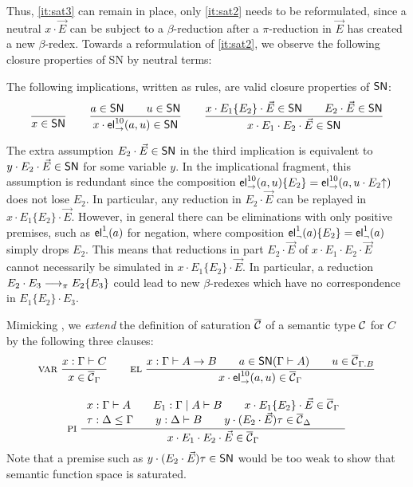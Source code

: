 Thus, \ref{it:sat3} can remain in place, only \ref{it:sat2} needs to
be reformulated, since a neutral $x \cdot \vec E$ can be subject to a
$\beta$-reduction after a $\pi$-reduction in $\vec E$ has created a
new $\beta$-redex.  Towards a reformulation of \ref{it:sat2}, we
observe the following closure properties of SN by neutral terms:
\begin{lemma}
  \label{lem:clos-ne}
  The following implications, written as rules, are valid closure
  properties of $\SN$:
\begin{gather*}
  \ru{}{x \in \SN}
\qquad
  \ru{a \in \SN \qquad u \in \SN
    }{x \cdot \el\to{10}(a,u) \in \SN}
\qquad
  \ru{x \cdot E_1\{E_2\} \cdot \vec E \in \SN \qquad
      E_2 \cdot \vec E \in \SN
    }{x \cdot E_1 \cdot E_2 \cdot \vec E \in \SN}
\end{gather*}
\end{lemma}
The extra assumption $E_2 \cdot \vec E \in \SN$ in the third
implication is equivalent to $y \cdot E_2 \cdot \vec E \in \SN$ for
some variable $y$.
In the implicational fragment, this assumption is
redundant since the composition $\el\to{10}(a,u)\{E_2\} =
\el\to{10}(a,u \cdot E_2\up)$ does not lose $E_2$.
In particular, any reduction in $E_2 \cdot \vec E$ can be replayed in
$x \cdot E_1\{E_2\} \cdot \vec E$.
However, in general there can be eliminations with only
positive premises, such as $\el\neg{1}(a)$ for negation, where composition
$\el\neg{1}(a)\{E_2\} = \el\neg{1}(a)$ simply drops $E_2$.
This means that reductions in part $E_2 \cdot \vec E$ of
$x \cdot E_1 \cdot E_2 \cdot \vec E$ cannot necessarily be simulated
in $x \cdot E_1\{E_2\} \cdot \vec E$.  In particular, a reduction $E_2
\cdot E_3 \red[\pi] E_2\{E_3\}$ could lead to new $\beta$-redexes which
have no correspondence in $E_1\{E_2\} \cdot E_3$.

\newcommand{\rvar}{\rulename{var}}
\newcommand{\rel}{\rulename{el}}
\newcommand{\rpi}{\rulename{pi}}

Mimicking ,
we \emph{extend} the definition of saturation $\cl\C$ of a semantic type $\C$
for $C$ by the following three clauses:
\begin{gather*}
  \nru{\rvar}{x : \Gamma \vdash C}{x \in \cl\C_\Gamma}
\qquad
  \nru{\rel
    }{x : \Gamma \vdash A \to B \qquad
      a \in \SN(\Gamma \vdash A) \qquad
      u \in \cl\C_{\Gamma.B}
    }{x \cdot \el\to{10}(a,u) \in \cl\C_\Gamma}
\\[2ex]
  \nrul{\rpi
    }{x : \Gamma \vdash A \qquad
      E_1 : \Gamma \mid A \vdash B \qquad
      x \cdot E_1\{E_2\} \cdot \vec E \in \cl\C_\Gamma \\
      \tau : \Delta \leq \Gamma \qquad
      y : \Delta \vdash B \qquad
      y \cdot (E_2 \cdot \vec E)\tau \in \cl\C_{\Delta}
    }{x \cdot E_1 \cdot E_2 \cdot \vec E \in \cl\C_\Gamma}
\end{gather*}
Note that a premise such as $y \cdot (E_2 \cdot \vec E)\tau \in \SN$ would
be too weak to show that semantic function space is saturated.

